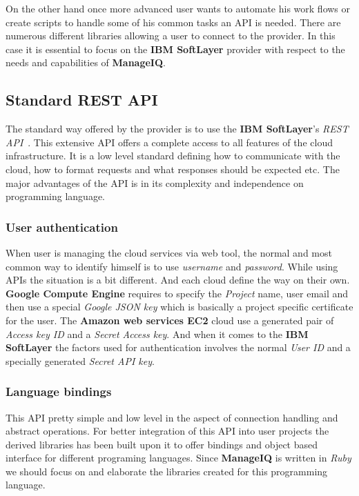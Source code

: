 On the other hand once more advanced user wants to automate his work flows or create scripts to handle some of his common tasks an API is needed. There are numerous different libraries allowing a user to connect to the provider. In this case it is essential to focus on the \textbf{IBM SoftLayer} provider with respect to the needs and capabilities of \textbf{ManageIQ}.

\subsection{Standard REST API}
\label{sub:Standard REST API}

The standard way offered by the provider is to use the \textbf{IBM SoftLayer}'s \emph{REST API}~\cite{restapi}. This extensive API offers a complete access to all features of the cloud infrastructure. It is a low level standard defining how to communicate with the cloud, how to format requests and what responses should be expected etc. The major advantages of the API is in its complexity and independence on programming language.

\subsubsection{User authentication}
\label{subs:User authentication}

When user is managing the cloud services via web tool, the normal and most common way to identify himself is to use \emph{username} and \emph{password}. While using APIs the situation is a bit different. And each cloud define the way on their own. \textbf{Google Compute Engine} requires to specify the \emph{Project} name, user email and then use a special \emph{Google JSON key} which is basically a project specific certificate for the user. The \textbf{Amazon web services EC2} cloud use a generated pair of \emph{Access key ID} and a \emph{Secret Access key}. And when it comes to the \textbf{IBM SoftLayer} the factors used for authentication involves the normal \emph{User ID} and a specially generated \emph{Secret API key}.

\subsubsection{Language bindings}
\label{subs:Language bindings}

This API pretty simple and low level in the aspect of connection handling and abstract operations. For better integration of this API into user projects the derived libraries has been built upon it to offer bindings and object based interface for different programing languages. Since \textbf{ManageIQ} is written in \emph{Ruby} we should focus on and elaborate the libraries created for this programming language.

